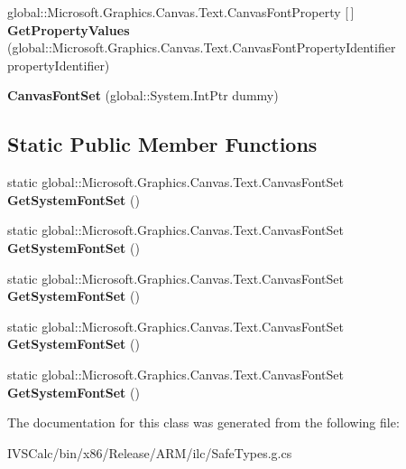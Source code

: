\begin{DoxyCompactItemize}
\item 
\mbox{\label{class_microsoft_1_1_graphics_1_1_canvas_1_1_text_1_1_canvas_font_set_ad5ad519ae1f152fedadf48d0d911f919}} 
global\+::\+Microsoft.\+Graphics.\+Canvas.\+Text.\+Canvas\+Font\+Property \mbox{[}$\,$\mbox{]} {\bfseries Get\+Property\+Values} (global\+::\+Microsoft.\+Graphics.\+Canvas.\+Text.\+Canvas\+Font\+Property\+Identifier property\+Identifier)
\item 
\mbox{\label{class_microsoft_1_1_graphics_1_1_canvas_1_1_text_1_1_canvas_font_set_aed5c881dc2a997f7281bf32d019b0d26}} 
{\bfseries Canvas\+Font\+Set} (global\+::\+System.\+Int\+Ptr dummy)
\end{DoxyCompactItemize}
\subsection*{Static Public Member Functions}
\begin{DoxyCompactItemize}
\item 
\mbox{\label{class_microsoft_1_1_graphics_1_1_canvas_1_1_text_1_1_canvas_font_set_a3ba6cc8842d92a045fb4da2819f0278d}} 
static global\+::\+Microsoft.\+Graphics.\+Canvas.\+Text.\+Canvas\+Font\+Set {\bfseries Get\+System\+Font\+Set} ()
\item 
\mbox{\label{class_microsoft_1_1_graphics_1_1_canvas_1_1_text_1_1_canvas_font_set_a3ba6cc8842d92a045fb4da2819f0278d}} 
static global\+::\+Microsoft.\+Graphics.\+Canvas.\+Text.\+Canvas\+Font\+Set {\bfseries Get\+System\+Font\+Set} ()
\item 
\mbox{\label{class_microsoft_1_1_graphics_1_1_canvas_1_1_text_1_1_canvas_font_set_a3ba6cc8842d92a045fb4da2819f0278d}} 
static global\+::\+Microsoft.\+Graphics.\+Canvas.\+Text.\+Canvas\+Font\+Set {\bfseries Get\+System\+Font\+Set} ()
\item 
\mbox{\label{class_microsoft_1_1_graphics_1_1_canvas_1_1_text_1_1_canvas_font_set_a3ba6cc8842d92a045fb4da2819f0278d}} 
static global\+::\+Microsoft.\+Graphics.\+Canvas.\+Text.\+Canvas\+Font\+Set {\bfseries Get\+System\+Font\+Set} ()
\item 
\mbox{\label{class_microsoft_1_1_graphics_1_1_canvas_1_1_text_1_1_canvas_font_set_a3ba6cc8842d92a045fb4da2819f0278d}} 
static global\+::\+Microsoft.\+Graphics.\+Canvas.\+Text.\+Canvas\+Font\+Set {\bfseries Get\+System\+Font\+Set} ()
\end{DoxyCompactItemize}


The documentation for this class was generated from the following file\+:\begin{DoxyCompactItemize}
\item 
I\+V\+S\+Calc/bin/x86/\+Release/\+A\+R\+M/ilc/Safe\+Types.\+g.\+cs\end{DoxyCompactItemize}

